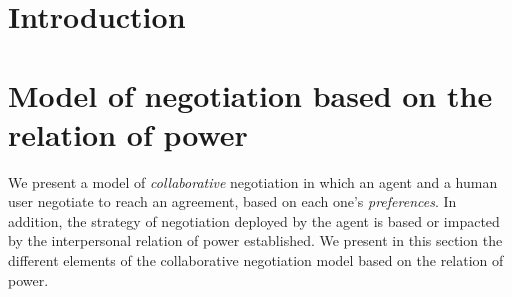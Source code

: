 \documentclass[runningheads,a4paper]{llncs}
\begin{document}
\mainmatter  %

\title{}



%
%
\author{Alfred Hofmann%
%
\and Ursula Barth\and Ingrid Haas\and Frank Holzwarth\and\\
Anna Kramer\and Leonie Kunz\and Christine Rei\ss\and\\
Nicole Sator\and Erika Siebert-Cole\and Peter Stra\ss er}
%



%
%

\maketitle


\begin{abstract}

\end{abstract}


\section{Introduction}


\section{Model of negotiation based on the relation of power}
	We present a model of \textit{collaborative} negotiation in which an agent and a human user negotiate to reach an agreement, based on each one's \textit{preferences}. In addition, the strategy of negotiation deployed by the agent is based or impacted by the interpersonal relation of power established.
We present in this section the different elements of the collaborative negotiation model based on the relation of power.
\end{document}
